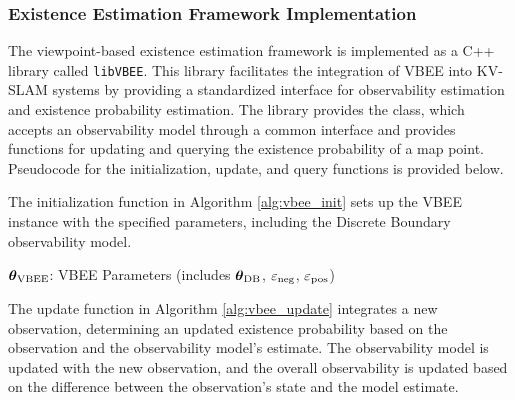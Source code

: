 \subsubsection{Existence Estimation Framework Implementation}

The viewpoint-based existence estimation framework is implemented as a C++ library called \texttt{libVBEE}. This library facilitates the integration of VBEE into KV-SLAM systems by providing a standardized interface for observability estimation and existence probability estimation. The library provides the \vbee{} class, which accepts an observability model through a common interface and provides functions for updating and querying the existence probability of a map point. Pseudocode for the initialization, update, and query functions is provided below.

The initialization function in Algorithm \ref{alg:vbee_init} sets up the VBEE instance with the specified parameters, including the Discrete Boundary observability model.

\begin{singlespace}
    \begin{algorithm}[H]
        \caption[VBEE Initialization]{VBEE Initialization: $\vbee.\initialize{\params{\vbee}}$}
        \label{alg:vbee_init}
        \begin{algorithmic}
            \Require $\boldsymbol{\theta}_{\text{VBEE}}$: VBEE Parameters (includes $\boldsymbol{\theta}_{\text{DB}}$, $\varepsilon_{\text{neg}}$, $\varepsilon_{\text{pos}}$)
        \end{algorithmic}
    \end{algorithm}
\end{singlespace}

The update function in Algorithm \ref{alg:vbee_update} integrates a new observation, determining an updated existence probability based on the observation and the observability model's estimate. The observability model is updated with the new observation, and the overall observability is updated based on the difference between the observation's state and the model estimate.

